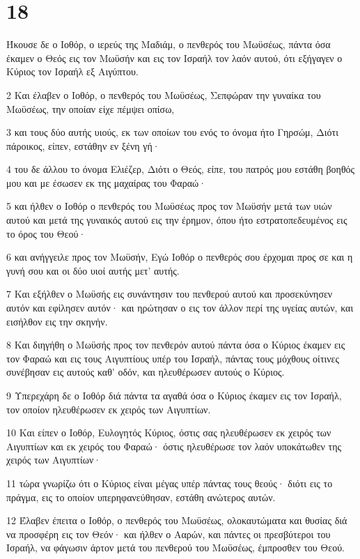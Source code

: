\chapter{18}

\par Ήκουσε δε ο Ιοθόρ, ο ιερεύς της Μαδιάμ, ο πενθερός του Μωϋσέως, πάντα όσα έκαμεν ο Θεός εις τον Μωϋσήν και εις τον Ισραήλ τον λαόν αυτού, ότι εξήγαγεν ο Κύριος τον Ισραήλ εξ Αιγύπτου.
\par 2 Και έλαβεν ο Ιοθόρ, ο πενθερός του Μωϋσέως, Σεπφώραν την γυναίκα του Μωϋσέως, την οποίαν είχε πέμψει οπίσω,
\par 3 και τους δύο αυτής υιούς, εκ των οποίων του ενός το όνομα ήτο Γηρσώμ, Διότι πάροικος, είπεν, εστάθην εν ξένη γή·
\par 4 του δε άλλου το όνομα Ελιέζερ, Διότι ο Θεός, είπε, του πατρός μου εστάθη βοηθός μου και με έσωσεν εκ της μαχαίρας του Φαραώ·
\par 5 και ήλθεν ο Ιοθόρ ο πενθερός του Μωϋσέως προς τον Μωϋσήν μετά των υιών αυτού και μετά της γυναικός αυτού εις την έρημον, όπου ήτο εστρατοπεδευμένος εις το όρος του Θεού·
\par 6 και ανήγγειλε προς τον Μωϋσήν, Εγώ Ιοθόρ ο πενθερός σου έρχομαι προς σε και η γυνή σου και οι δύο υιοί αυτής μετ' αυτής.
\par 7 Και εξήλθεν ο Μωϋσής εις συνάντησιν του πενθερού αυτού και προσεκύνησεν αυτόν και εφίλησεν αυτόν· και ηρώτησαν ο εις τον άλλον περί της υγείας αυτών, και εισήλθον εις την σκηνήν.
\par 8 Και διηγήθη ο Μωϋσής προς τον πενθερόν αυτού πάντα όσα ο Κύριος έκαμεν εις τον Φαραώ και εις τους Αιγυπτίους υπέρ του Ισραήλ, πάντας τους μόχθους οίτινες συνέβησαν εις αυτούς καθ' οδόν, και ηλευθέρωσεν αυτούς ο Κύριος.
\par 9 Υπερεχάρη δε ο Ιοθόρ διά πάντα τα αγαθά όσα ο Κύριος έκαμεν εις τον Ισραήλ, τον οποίον ηλευθέρωσεν εκ χειρός των Αιγυπτίων.
\par 10 Και είπεν ο Ιοθόρ, Ευλογητός Κύριος, όστις σας ηλευθέρωσεν εκ χειρός των Αιγυπτίων και εκ χειρός του Φαραώ· όστις ηλευθέρωσε τον λαόν υποκάτωθεν της χειρός των Αιγυπτίων·
\par 11 τώρα γνωρίζω ότι ο Κύριος είναι μέγας υπέρ πάντας τους θεούς· διότι εις το πράγμα, εις το οποίον υπερηφανεύθησαν, εστάθη ανώτερος αυτών.
\par 12 Έλαβεν έπειτα ο Ιοθόρ, ο πενθερός του Μωϋσέως, ολοκαυτώματα και θυσίας διά να προσφέρη εις τον Θεόν· και ήλθεν ο Ααρών, και πάντες οι πρεσβύτεροι του Ισραήλ, να φάγωσιν άρτον μετά του πενθερού του Μωϋσέως, έμπροσθεν του Θεού.
